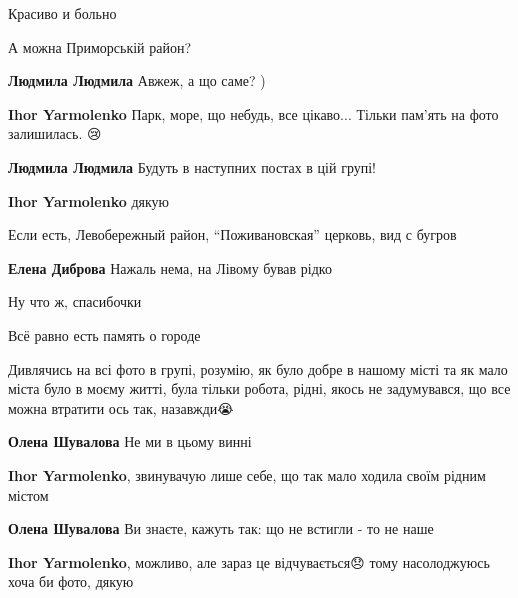 
Красиво и больно


А можна Приморській район?

\begin{itemize} %
\textbf{Людмила Людмила} Авжеж, а що саме? )

\textbf{Ihor Yarmolenko} Парк, море, що небудь, все цікаво... Тільки пам'ять на фото залишилась. 😢

\begin{itemize} %
\textbf{Людмила Людмила} Будуть в наступних постах в цій групі!
\end{itemize} %

\textbf{Ihor Yarmolenko} дякую 🤗

\end{itemize} %


Если есть, Левобережный район, \enquote{Поживановская} церковь, вид с бугров🙂

\begin{itemize} %
\textbf{Елена Диброва} Нажаль нема, на Лівому бував рідко 🙁


Ну что ж, спасибочки

Всё равно есть память о городе🙂
\end{itemize} %


Дивлячись на всі фото в групі, розумію, як було добре в нашому місті та як мало
міста було в моєму житті, була тільки робота, рідні, якось не задумувався, що
все можна втратити ось так, назавжди😭

\begin{itemize} %
\textbf{Олена Шувалова} Не ми в цьому винні

\begin{itemize} %
\textbf{Ihor Yarmolenko}, звинувачую лише себе, що так мало ходила своїм рідним містом

\textbf{Олена Шувалова} Ви знаєте, кажуть так: що не встигли - то не наше

\textbf{Ihor Yarmolenko}, можливо, але зараз це відчувається😞 тому насолоджуюсь хоча би фото, дякую
\end{itemize} %

\end{itemize} %
